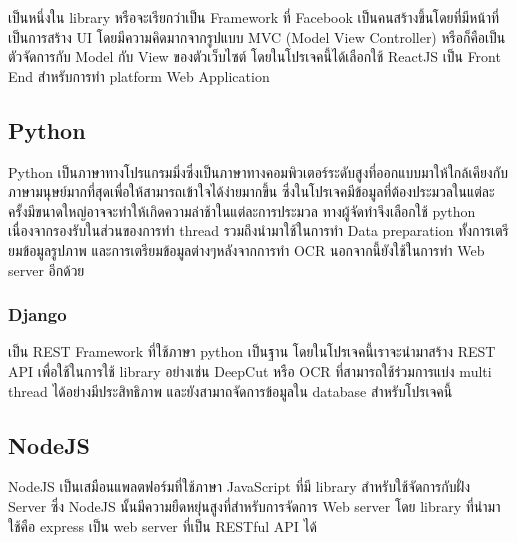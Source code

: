 เป็นหนึ่งใน library หรือจะเรียกว่าเป็น Framework ที่ Facebook  เป็นคนสร้างขึ้นโดยที่มีหน้าที่เป็นการสร้าง UI โดยมีความคิดมากจากรูปแบบ MVC \cite{techterms} (Model View Controller) หรือก็คือเป็นตัวจัดการกับ Model กับ View ของตัวเว็บไซต์ โดยในโปรเจคนี้ได้เลือกใช้ ReactJS เป็น Front End สำหรับการทำ platform Web Application 

\subsection{Python}

Python เป็นภาษาทางโปรแกรมมิ่งซึ่งเป็นภาษาทางคอมพิวเตอร์ระดับสูงที่ออกแบบมาให้ใกล้เคียงกับภาษามนุษย์มากที่สุดเพื่อให้สามารถเข้าใจได้ง่ายมากขึ้น ซึ่งในโปรเจคมีข้อมูลที่ต้องประมวลในแต่ละครั้งมีขนาดใหญ่อาจจะทำให้เกิดความล่าช้าในแต่ละการประมวล ทางผู้จัดทำจึงเลือกใช้ python เนื่องจากรองรับในส่วนของการทำ thread รวมถึงนำมาใช้ในการทำ Data preparation ทั้งการเตรียมข้อมูลรูปภาพ และการเตรียมข้อมูลต่างๆหลังจากการทำ OCR นอกจากนี้ยังใช้ในการทำ Web server อีกด้วย 

\subsubsection{Django}

เป็น REST Framework ที่ใช้ภาษา python เป็นฐาน โดยในโปรเจคนี้เราจะนำมาสร้าง REST API  เพื่อใช้ในการใช้ library อย่างเช่น DeepCut หรือ OCR ที่สามารถใช้ร่วมการแบ่ง multi thread ได้อย่างมีประสิทธิภาพ และยังสามาถจัดการข้อมูลใน database สำหรับโปรเจคนี้

\subsection{NodeJS}

NodeJS เป็นเสมือนแพลตฟอร์มที่ใช้ภาษา JavaScript ที่มี library สำหรับใช้จัดการกับฝั่ง Server ซึ่ง NodeJS นั้นมีความยืดหยุ่นสูงที่สำหรับการจัดการ Web server โดย library ที่นำมาใช้คือ express เป็น web server ที่เป็น RESTful API ได้